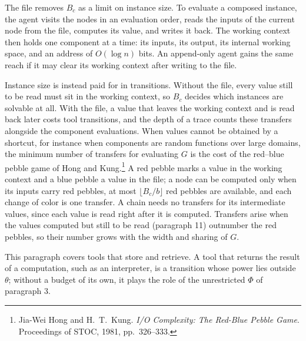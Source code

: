 \documentclass[11pt]{article}
\begin{document}
The file removes $B_c$ as a limit on instance size. To evaluate a
composed instance, the agent visits the nodes in an evaluation order,
reads the inputs of the current node from the file, computes its value,
and writes it back. The working context then holds one component at a
time: its inputs, its output, its internal working space, and an address
of $O(\log n)$ bits. An append-only agent gains the same reach if it may
clear its working context after writing to the file.

Instance size is instead paid for in transitions. Without the file,
every value still to be read must sit in the working context, so $B_c$
decides which instances are solvable at all. With the file, a value that
leaves the working context and is read back later costs tool
transitions, and the depth of a trace counts these transfers alongside
the component evaluations. When values cannot be obtained by a shortcut,
for instance when components are random functions over large domains,
the minimum number of transfers for evaluating $G$ is the cost of the
red--blue pebble game of Hong and Kung.\footnote{Jia-Wei Hong and
H.~T.~Kung. \emph{I/O Complexity: The Red-Blue Pebble Game}. Proceedings
of STOC, 1981, pp.\ 326--333.} A red pebble marks a value in the working
context and a blue pebble a value in the file; a node can be computed
only when its inputs carry red pebbles, at most $\lfloor B_c/b\rfloor$
red pebbles are available, and each change of color is one transfer. A
chain needs no transfers for its intermediate values, since each value
is read right after it is computed. Transfers arise when the values
computed but still to be read (paragraph 11) outnumber the red pebbles,
so their number grows with the width and sharing of $G$.

This paragraph covers tools that store and retrieve. A tool that returns
the result of a computation, such as an interpreter, is a transition
whose power lies outside $\theta$; without a budget of its own, it plays
the role of the unrestricted $\Phi$ of paragraph 3.
\end{document}
